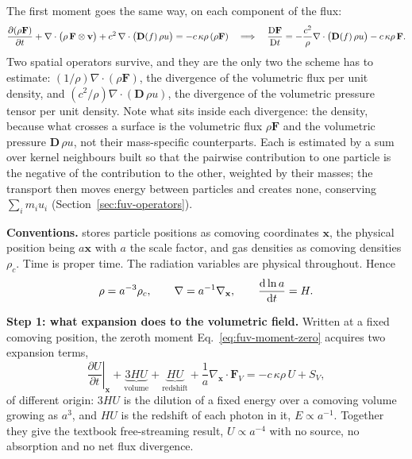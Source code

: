 The first moment goes the same way, on each component of the flux:
\begin{equation}
  \frac{\partial(\rho \mathbf F)}{\partial t}
  + \nabla\cdot\big(\rho\,\mathbf F\otimes\mathbf v\big)
  + c^2\,\nabla\cdot\big(\mathbf D(f)\,\rho u\big)
  = -c\,\kappa\rho\,(\rho\mathbf F)
  \quad\Longrightarrow\quad
  \frac{{\rm D}\mathbf F}{{\rm D}t}
  = -\frac{c^2}{\rho}\nabla\cdot\big(\mathbf D(f)\,\rho u\big)
    - c\,\kappa\rho\,\mathbf F .
  \label{eq:fuv-lagr-F}
\end{equation}
Two spatial operators survive, and they are the only two the scheme has to
estimate: $(1/\rho)\nabla\cdot(\rho\mathbf F)$, the divergence of the
volumetric flux per unit density, and
$(c^2/\rho)\nabla\cdot(\mathbf D\,\rho u)$, the divergence of the
volumetric pressure tensor per unit density. Note what sits inside each
divergence: the density, because what crosses a surface is the volumetric
flux $\rho\mathbf F$ and the volumetric pressure $\mathbf D\,\rho u$, not
their mass-specific counterparts. Each is estimated by a sum over kernel
neighbours built so that the pairwise contribution to one particle is the
negative of the contribution to the other, weighted by their masses; the
transport then moves energy between particles and creates none, conserving
$\sum_i m_i u_i$ (Section~\ref{sec:fuv-operators}).

\textbf{Conventions.} \swift{} stores particle positions as comoving
coordinates $\mathbf x$, the physical position being $a\mathbf x$ with $a$
the scale factor, and gas densities as comoving densities $\rho_c$. Time is
proper time. The radiation variables are physical throughout. Hence
\begin{equation}
  \rho = a^{-3}\rho_c , \qquad
  \nabla = a^{-1}\nabla_{\mathbf x} , \qquad
  \frac{{\rm d}\ln a}{{\rm d}t} = H .
  \label{eq:fuv-cosmo-conventions}
\end{equation}

\textbf{Step 1: what expansion does to the volumetric field.} Written at a
fixed comoving position, the zeroth moment
Eq.~\ref{eq:fuv-moment-zero} acquires two expansion terms,
\begin{equation}
  \left.\frac{\partial U}{\partial t}\right|_{\mathbf x}
  + \underbrace{3HU}_{\text{volume}} + \underbrace{HU}_{\text{redshift}}
  + \frac{1}{a}\nabla_{\mathbf x}\cdot\mathbf F_V
  = -c\,\kappa\rho\,U + S_V ,
  \label{eq:fuv-cosmo-U}
\end{equation}
of different origin: $3HU$ is the dilution of a fixed energy over a
comoving volume growing as $a^3$, and $HU$ is the redshift of each photon
in it, $E\propto a^{-1}$. Together they give the textbook free-streaming
result, $U\propto a^{-4}$ with no source, no absorption and no net flux
divergence.

